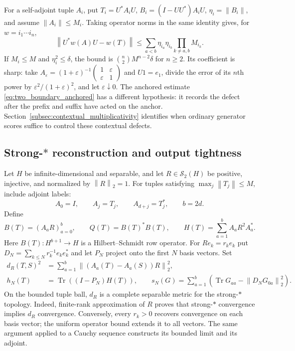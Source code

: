 \documentclass[11pt,a4paper]{amsart}
\numberwithin{equation}{section}
\theoremstyle{definition}
\theoremstyle{remark}
\newcommand{\Sch}{\mathcal S}
\DeclareMathOperator{\Tr}{Tr}
\newcommand{\norm}[1]{\left\lVert#1\right\rVert}
\begin{document}
For a self-adjoint tuple $A_i$, put $T_i=U^*A_iU$, $B_i=(I-UU^*)A_iU$, $\eta_i=\norm{B_i}$, and assume $\norm{A_i}\le M_i$. Taking operator norms in the same identity gives, for $w=i_1\cdots i_n$,
\begin{equation}\label{eq:twoleakage}
 \norm{U^*w(A)U-w(T)}
 \le\sum_{a<b}\eta_{i_a}\eta_{i_b}\prod_{k\ne a,b}M_{i_k}.
\end{equation}
If $M_i\le M$ and $\eta_i^2\le\delta$, the bound is $\binom n2M^{n-2}\delta$ for $n\ge2$. Its coefficient is sharp: take
$A_\varepsilon=(1+\varepsilon)^{-1}\left(\begin{smallmatrix}1&\varepsilon\\\varepsilon&1\end{smallmatrix}\right)$ and $U1=e_1$, divide the error of its $n$th power by $\varepsilon^2/(1+\varepsilon)^2$, and let $\varepsilon\downarrow0$.
The anchored estimate \eqref{eq:two_boundary_anchored} has a different hypothesis: it records the defect after the prefix and suffix have acted on the anchor. Section~\ref{subsec:contextual_multiplicativity} identifies when ordinary generator scores suffice to control these contextual defects.

\subsection{\texorpdfstring{Strong-$*$}{Strong-*} reconstruction and output tightness}
Let $H$ be infinite-dimensional and separable, and let $R\in\Sch_2(H)$ be positive, injective, and normalized by $\norm R_2=1$. For tuples satisfying $\max_j\norm{T_j}\le M$, include adjoint labels:
\[
 A_0=I,\qquad A_j=T_j,\qquad A_{d+j}=T_j^*,\qquad b=2d.
\]
Define
\begin{equation}\label{eq:QH}
 B(T)=(A_aR)_{a=0}^b,\qquad Q(T)=B(T)^*B(T),\qquad
 H(T)=\sum_{a=1}^bA_aR^2A_a^*.
\end{equation}
Here $B(T):H^{b+1}\to H$ is a Hilbert--Schmidt row operator. For $Re_k=r_ke_k$ put $D_N=\sum_{k\le N}r_k^{-1}e_ke_k^*$ and let $P_N$ project onto the first $N$ basis vectors. Set
\begin{align}
 d_R(T,S)^2&=\sum_{a=1}^b\norm{(A_a(T)-A_a(S))R}_2^2,\label{eq:strongmetric}\\
 h_N(T)&=\Tr((I-P_N)H(T)),\qquad
 s_N(G)=\sum_{a=1}^b\left(\Tr G_{aa}-\norm{D_NG_{0a}}_2^2\right).
 \label{eq:flatmass}
\end{align}
On the bounded tuple ball, $d_R$ is a complete separable metric for the strong-$*$ topology. Indeed, finite-rank approximation of $R$ proves that strong-$*$ convergence implies $d_R$ convergence. Conversely, every $r_k>0$ recovers convergence on each basis vector; the uniform operator bound extends it to all vectors. The same argument applied to a Cauchy sequence constructs its bounded limit and its adjoint.
\end{document}
